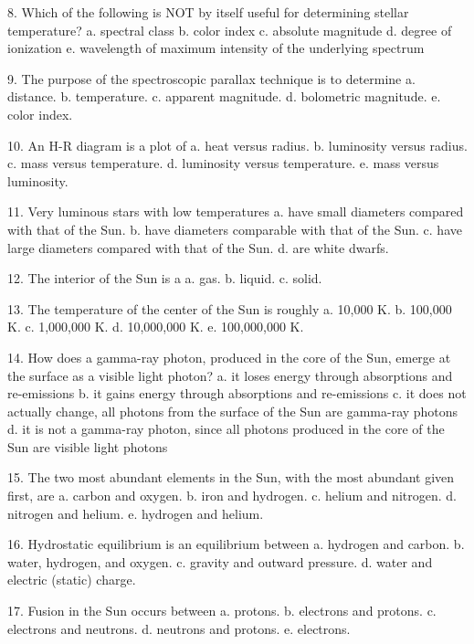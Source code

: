 8. Which of the following is NOT by itself useful for determining stellar temperature?
    a. spectral class
    b. color index
    c. absolute magnitude
    d. degree of ionization
    e. wavelength of maximum intensity of the underlying spectrum

9. The purpose of the spectroscopic parallax technique is to determine
    a. distance.
    b. temperature.
    c. apparent magnitude.
    d. bolometric magnitude.
    e. color index.

10. An H-R diagram is a plot of
    a. heat versus radius.
    b. luminosity versus radius.
    c. mass versus temperature.
    d. luminosity versus temperature.
    e. mass versus luminosity.

11. Very luminous stars with low temperatures
    a. have small diameters compared with that of the Sun.
    b. have diameters comparable with that of the Sun.
    c. have large diameters compared with that of the Sun.
    d. are white dwarfs.

12. The interior of the Sun is a
      a.  gas.
      b.  liquid.
      c.  solid.
       
13. The temperature of the center of the Sun is roughly
      a.  10,000 K.
      b.  100,000 K.
      c.  1,000,000 K.
      d.  10,000,000 K.
      e.  100,000,000 K.
       
14. How does a gamma-ray photon, produced in the core of the Sun, emerge at the surface as a visible light photon?
      a.  it loses energy through absorptions and re-emissions
      b.  it gains energy through absorptions and re-emissions
      c.  it does not actually change, all photons from the surface of the Sun are gamma-ray photons
      d.  it is not a gamma-ray photon, since all photons produced in the core of the Sun are visible light photons
       
15. The two most abundant elements in the Sun, with the most abundant given first, are
      a.  carbon and oxygen.
      b.  iron and hydrogen.
      c.  helium and nitrogen.
      d.  nitrogen and helium.
      e.  hydrogen and helium.
       
16. Hydrostatic equilibrium is an equilibrium between
      a.  hydrogen and carbon.
      b.  water, hydrogen, and oxygen.
      c.  gravity and outward pressure.
      d.  water and electric (static) charge.
       
 17. Fusion in the Sun occurs between
      a.  protons.
      b.  electrons and protons.
      c.  electrons and neutrons.
      d.  neutrons and protons.
      e.  electrons.
       
